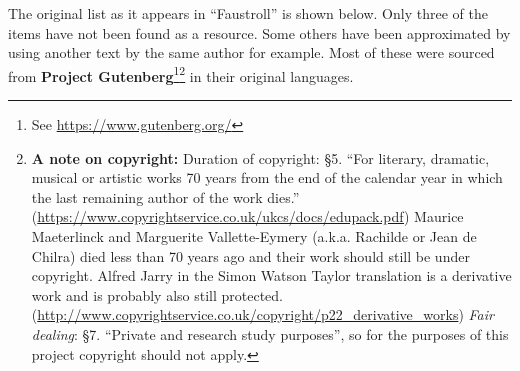 The original list as it appears in ``Faustroll'' is shown below. Only three of the items have not been found as a resource. Some others have been approximated by using another text by the same author for example. Most of these were sourced from \textbf{Project Gutenberg}\footnote{See \url{https://www.gutenberg.org/}}\footnote{\textbf{A note on copyright:} Duration of copyright: §5. ``For literary, dramatic, musical or artistic works 70 years from the end of the calendar year in which the last remaining author of the work dies.'' (\url{https://www.copyrightservice.co.uk/ukcs/docs/edupack.pdf}) Maurice Maeterlinck and Marguerite Vallette-Eymery (a.k.a. Rachilde or Jean de Chilra) died less than 70 years ago and their work should still be under copyright. Alfred Jarry in the Simon Watson Taylor translation is a derivative work and is probably also still protected.  (\url{http://www.copyrightservice.co.uk/copyright/p22_derivative_works}) \emph{Fair dealing}: §7. ``Private and research study purposes'', so for the purposes of this project copyright should not apply.} in their original languages.


